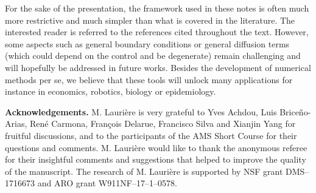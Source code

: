 \documentclass{amsproc}
\theoremstyle{definition}
\theoremstyle{remark}
\numberwithin{equation}{section}
\begin{document}
For the sake of the presentation, the framework used in these notes is often much more restrictive and much simpler than what is covered in the literature. The interested reader is referred to the references cited throughout the text. However, some aspects such as general boundary conditions or general diffusion terms (which could depend on the control and be degenerate) remain challenging and will hopefully be addressed in future works.   Besides the development of numerical methods per se, we believe that these tools will unlock many applications for instance in economics, robotics, biology or epidemiology. 


\vskip 6pt
\noindent \textbf{Acknowledgements. } M. Lauri{\`e}re is very grateful to Yves Achdou, Luis Brice\~{n}o-Arias, Ren\'e Carmona, Fran{\c c}ois Delarue, Francisco Silva and Xianjin Yang for fruitful discussions, and to the participants of the AMS Short Course for their questions and comments. M. Lauri{\`e}re would like to thank the anonymous referee for their insightful comments and suggestions that helped to improve the quality of the manuscript. 
The research of M. Lauri\`ere is supported by NSF grant DMS--1716673 and ARO grant W911NF--17--1--0578.










\printindex
\end{document}
